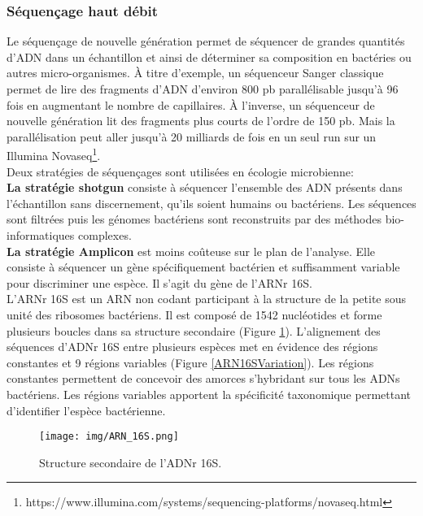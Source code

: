 \documentclass[12pt,a4paper]{article}
\begin{document}
\subsubsection{Séquençage haut débit}
Le séquençage de nouvelle génération permet de séquencer de grandes quantités d'ADN dans un échantillon et ainsi de déterminer sa composition en bactéries ou autres micro-organismes. À titre d'exemple, un séquenceur Sanger classique permet de lire des fragments d'ADN d'environ 800 pb parallélisable jusqu'à 96 fois en augmentant le nombre de capillaires.
À l'inverse, un séquenceur de nouvelle génération lit des fragments plus courts de l'ordre de 150 pb. Mais la parallélisation peut aller jusqu'à 20 milliards de fois en un seul run sur un Illumina Novaseq\footnote{https://www.illumina.com/systems/sequencing-platforms/novaseq.html}. \\
Deux stratégies de séquençages sont utilisées en écologie microbienne:  \\
\textbf{La stratégie shotgun} consiste à séquencer l'ensemble des  ADN présents dans l'échantillon sans discernement, qu'ils soient humains ou bactériens. Les séquences sont filtrées puis les génomes bactériens sont reconstruits par des méthodes bio-informatiques complexes. \\
\textbf{La stratégie Amplicon} est moins coûteuse sur le plan de l'analyse. Elle consiste à séquencer un gène spécifiquement bactérien et suffisamment variable pour discriminer une espèce. Il s'agit du gène de l'ARNr 16S.\\
L'ARNr 16S est un ARN non codant participant à la structure de la petite sous unité des ribosomes bactériens. Il est composé de 1542 nucléotides et forme plusieurs boucles dans sa structure secondaire (Figure \ref{ARN16S}).
L'alignement des séquences d'ADNr 16S entre plusieurs espèces met en évidence des régions constantes et 9 régions variables (Figure \ref{ARN16SVariation}). Les régions constantes permettent de concevoir des amorces s'hybridant sur tous les ADNs bactériens. Les régions variables apportent la spécificité taxonomique permettant d'identifier l'espèce bactérienne.

\begin{figure}[ht]
\begin{center}
\texttt{[image: img/ARN\_16S.png]}\hfill
\end{center}
\caption{Structure secondaire de l'ADNr 16S.}
\label{ARN16S}
\end{figure}
\end{document}
